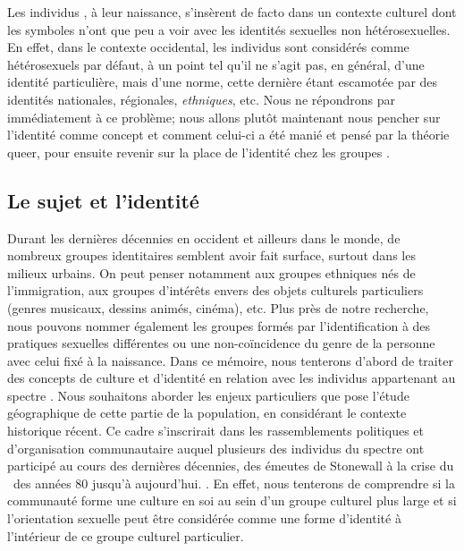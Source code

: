 Les individus \lgbt{}, à leur naissance, s'insèrent de facto dans un contexte culturel dont les symboles n'ont que peu a voir avec les identités sexuelles non hétérosexuelles. 
En effet, dans le contexte occidental, les individus sont considérés comme hétérosexuels par défaut, à un point tel qu'il ne s'agit pas, en général, d'une identité particulière, mais d'une norme, cette dernière étant escamotée par des identités nationales, régionales, \emph{ethniques}, etc.
Nous ne répondrons par immédiatement à ce problème; nous allons plutôt maintenant nous pencher sur l'identité comme concept et comment celui-ci a été manié et pensé par la théorie queer, pour ensuite revenir sur la place de l'identité chez les groupes \lgbt{}.

\subsection{Le sujet et l'identité}
\label{subsec:sujet_et_identité} Durant les dernières décennies en occident et ailleurs dans le monde, de nombreux groupes identitaires semblent avoir fait surface, surtout dans les milieux urbains. 
On peut penser notamment aux groupes ethniques nés de l'immigration, aux groupes d'intérêts envers des objets culturels particuliers (genres musicaux, dessins animés, cinéma), etc. 
Plus près de notre recherche, nous pouvons nommer également les groupes formés par l'identification à des pratiques sexuelles différentes ou une non-coïncidence du genre de la personne avec celui fixé à la naissance. 
Dans ce mémoire, nous tenterons d'abord de traiter des concepts de culture et d'identité en relation avec les individus appartenant au spectre \lgbt{} . 
Nous souhaitons aborder les enjeux particuliers que pose l'étude géographique de cette partie de la population, en considérant le contexte historique récent. 
Ce cadre s'inscrirait dans les rassemblements politiques et d'organisation communautaire auquel plusieurs des individus du spectre \lgbt{} ont participé au cours des dernières décennies, des émeutes de Stonewall à la crise du \sida\ des années 80 jusqu'à aujourd'hui.
. 
En effet, nous tenterons de comprendre si la communauté \lgbt{} forme une culture en soi au sein d'un groupe culturel plus large et si l'orientation sexuelle peut être considérée comme une forme d'identité à l'intérieur de ce groupe culturel particulier. 

